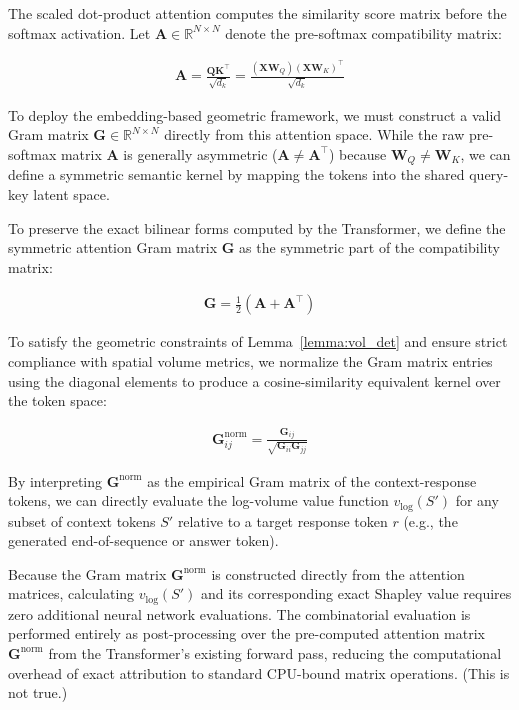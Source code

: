 \documentclass{article}
\begin{document}
The scaled dot-product attention computes the similarity score matrix before the softmax activation. Let $\mathbf{A} \in \mathbb{R}^{N \times N}$ denote the pre-softmax compatibility matrix:

\begin{align}\label{eq:raw_attention}
    \mathbf{A} = \frac{\mathbf{Q}\mathbf{K}^\top}{\sqrt{d_k}} = \frac{(\mathbf{X}\mathbf{W}_Q)(\mathbf{X}\mathbf{W}_K)^\top}{\sqrt{d_k}}
\end{align}

To deploy the embedding-based geometric framework, we must construct a valid Gram matrix $\mathbf{G} \in \mathbb{R}^{N \times N}$ directly from this attention space. While the raw pre-softmax matrix $\mathbf{A}$ is generally asymmetric ($\mathbf{A} \neq \mathbf{A}^\top$) because $\mathbf{W}_Q \neq \mathbf{W}_K$, we can define a symmetric semantic kernel by mapping the tokens into the shared query-key latent space. 

To preserve the exact bilinear forms computed by the Transformer, we define the symmetric attention Gram matrix $\mathbf{G}$ as the symmetric part of the compatibility matrix:

\begin{align}\label{eq:attention_gram}
    \mathbf{G} = \frac{1}{2} \left( \mathbf{A} + \mathbf{A}^\top \right)
\end{align}

To satisfy the geometric constraints of Lemma~\ref{lemma:vol_det} and ensure strict compliance with spatial volume metrics, we normalize the Gram matrix entries using the diagonal elements to produce a cosine-similarity equivalent kernel over the token space:

\begin{align}\label{eq:normalized_attention_gram}
    \mathbf{G}_{ij}^{\text{norm}} = \frac{\mathbf{G}_{ij}}{\sqrt{\mathbf{G}_{ii} \mathbf{G}_{jj}}}
\end{align}

By interpreting $\mathbf{G}^{\text{norm}}$ as the empirical Gram matrix of the context-response tokens, we can directly evaluate the log-volume value function $v_{\log}(S')$ for any subset of context tokens $S'$ relative to a target response token $r$ (e.g., the generated end-of-sequence or answer token). 

Because the Gram matrix $\mathbf{G}^{\text{norm}}$ is constructed directly from the attention matrices, calculating $v_{\log}(S')$ and its corresponding exact Shapley value requires zero additional neural network evaluations. The combinatorial evaluation is performed entirely as post-processing over the pre-computed attention matrix $\mathbf{G}^{\text{norm}}$ from the Transformer's existing forward pass, reducing the computational overhead of exact attribution to standard CPU-bound matrix operations. (This is not true.)
\end{document}
